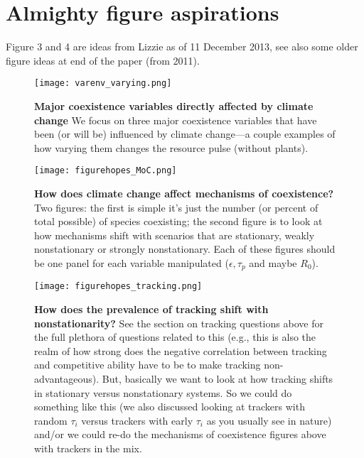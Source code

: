 \documentclass[11pt,a4paper,oneside]{article}
\begin{document}
\newpage
\section{Almighty figure aspirations} 
\noindent Figure 3 and 4 are ideas from Lizzie as of 11 December 2013, see also some older figure ideas at end of the paper (from 2011). 

\begin{figure}[h!]
\centering
\noindent \texttt{[image: varenv\_varying.png]}
\caption{{\bf Major coexistence variables directly affected by
    climate change}  We focus on three major coexistence variables
  that have been (or will be) influenced by climate change---a couple
  examples of how varying them changes the resource pulse (without plants).}
\end{figure}

\newpage
\begin{figure}[h!]
\centering
\noindent \texttt{[image: figurehopes\_MoC.png]}
\caption{{\bf How does climate change affect mechanisms of coexistence?} Two figures: the first is simple it's just the number (or percent of total possible) of species coexisting; the second figure is to look at how mechanisms shift with scenarios that are stationary, weakly nonstationary or strongly nonstationary. Each of these figures should be one panel for each variable manipulated (\(\epsilon, \tau_{p}\) and maybe \(R_{0}\)).}
\end{figure}

\newpage
\begin{figure}[h!]
\centering
\noindent \texttt{[image: figurehopes\_tracking.png]}
\caption{{\bf How does the prevalence of tracking shift with nonstationarity?} See the section on tracking questions above for the full plethora of questions related to this (e.g., this is also the realm of how strong does the negative correlation between tracking and competitive ability have to be to make tracking non-advantageous). But, basically we want to look at how tracking shifts in stationary versus nonstationary systems. So we could do something like this (we also discussed looking at trackers with random \(\tau_{i}\) versus trackers with early \(\tau_{i}\) as you usually see in nature) and/or we could re-do the mechanisms of coexistence figures above with trackers in the mix.}
\end{figure}
\end{document}
